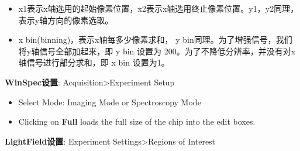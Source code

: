 \begin{itemize}
\begin{itemize}
\item x1表示x轴选用的起始像素位置，x2表示x轴选用终止像素位置。y1，y2同理，表示y轴方向的像素选取。
\item x bin(binning)，表示x轴每多少像素求和， y bin同理。为了增强信号，我们将y轴信号全部加起来，即 y bin 设置为 200。为了不降低分辨率，并没有对x轴信号进行部分求和，即 x bin 设置为1。
\end{itemize}
\textbf{WinSpec设置}: Acquisition>Experiment Setup
\begin{itemize}
\item Select Mode: Imaging Mode or Spectroscopy Mode
\item Clicking on \textbf{Full} loads the full size of the chip into the edit boxes.
\end{itemize}
\textbf{LightField设置}: Experiment Settings>Regions of Interest


\end{itemize}
